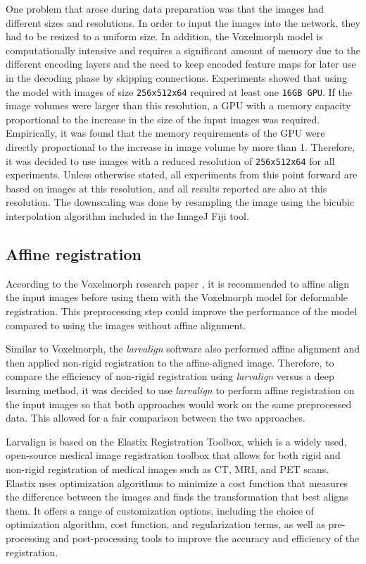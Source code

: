 \documentclass{book}
\begin{document}
	One problem that arose during data preparation was that the images had different sizes and resolutions. In order to input the images into the network, they had to be resized to a uniform size. In addition, the Voxelmorph model is computationally intensive and requires a significant amount of memory due to the different encoding layers and the need to keep encoded feature maps for later use in the decoding phase by skipping connections. Experiments showed that using the model with images of size \texttt{256x512x64} required at least one \texttt{16GB GPU}. If the image volumes were larger than this resolution, a GPU with a memory capacity proportional to the increase in the size of the input images was required. Empirically, it was found that the memory requirements of the GPU were directly proportional to the increase in image volume by more than 1. Therefore, it was decided to use images with a reduced resolution of \texttt{256x512x64} for all experiments. Unless otherwise stated, all experiments from this point forward are based on images at this resolution, and all results reported are also at this resolution. The downscaling was done by resampling the image using the bicubic interpolation algorithm included in the ImageJ Fiji tool.
	
	\subsection{Affine registration}
	According to the Voxelmorph research paper \cite{Balakrishnan_2019}, it is recommended to affine align the input images before using them with the Voxelmorph model for deformable registration. This preprocessing step could improve the performance of the model compared to using the images without affine alignment.
	
	Similar to Voxelmorph, the \textit{larvalign} software also performed affine alignment and then applied non-rigid registration to the affine-aligned image. Therefore, to compare the efficiency of non-rigid registration using \textit{larvalign} versus a deep learning method, it was decided to use \textit{larvalign} to perform affine registration on the input images so that both approaches would work on the same preprocessed data. This allowed for a fair comparison between the two approaches.
	
	\begin{tcolorbox}[colback=rwth-blue-5,colframe=rwth-blue-1,title=\textbf{Larvalign Software}]
		Larvalign is based on the Elastix Registration Toolbox, which is a widely used, open-source medical image registration toolbox that allows for both rigid and non-rigid registration of medical images such as CT, MRI, and PET scans.
		\tcblower
		Elastix uses optimization algorithms to minimize a cost function that measures the difference between the images and finds the transformation that best aligns them. It offers a range of customization options, including the choice of optimization algorithm, cost function, and regularization terms, as well as pre-processing and post-processing tools to improve the accuracy and efficiency of the registration.
	\end{tcolorbox}
	
\end{document}

